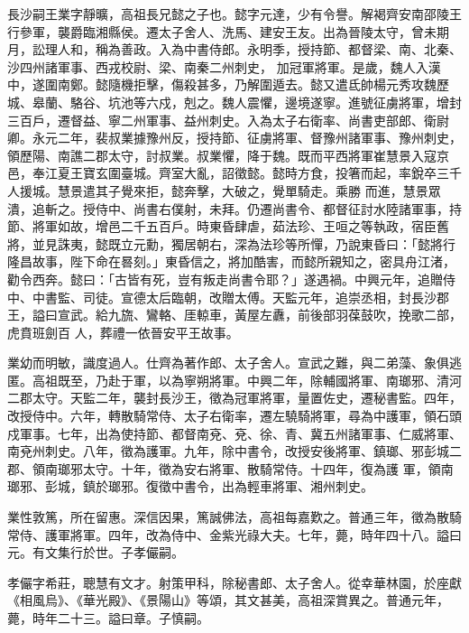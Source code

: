 
\begin{pinyinscope}

 長沙嗣王業字靜曠，高祖長兄懿之子也。懿字元達，少有令譽。解褐齊安南邵陵王行參軍，襲爵臨湘縣侯。遷太子舍人、洗馬、建安王友。出為晉陵太守，曾未期月，訟理人和，稱為善政。入為中書侍郎。永明季，授持節、都督梁、南、北秦、沙四州諸軍事、西戎校尉、梁、南秦二州刺史，
 加冠軍將軍。是歲，魏人入漢中，遂圍南鄭。懿隨機拒擊，傷殺甚多，乃解圍遁去。懿又遣氐帥楊元秀攻魏歷城、皋蘭、駱谷、坑池等六戍，剋之。魏人震懼，邊境遂寧。進號征虜將軍，增封三百戶，遷督益、寧二州軍事、益州刺史。入為太子右衛率、尚書吏部郎、衛尉卿。永元二年，裴叔業據豫州反，授持節、征虜將軍、督豫州諸軍事、豫州刺史，領歷陽、南譙二郡太守，討叔業。叔業懼，降于魏。既而平西將軍崔慧景入寇京邑，奉江夏王寶玄圍臺城。齊室大亂，詔徵懿。懿時方食，投箸而起，率銳卒三千人援城。慧景遣其子覺來拒，懿奔擊，大破之，覺單騎走。乘勝
 而進，慧景眾潰，追斬之。授侍中、尚書右僕射，未拜。仍遷尚書令、都督征討水陸諸軍事，持節、將軍如故，增邑二千五百戶。時東昏肆虐，茹法珍、王咺之等執政，宿臣舊將，並見誅夷，懿既立元勳，獨居朝右，深為法珍等所憚，乃說東昏曰：「懿將行隆昌故事，陛下命在晷刻。」東昏信之，將加酷害，而懿所親知之，密具舟江渚，勸令西奔。懿曰：「古皆有死，豈有叛走尚書令耶？」遂遇禍。中興元年，追贈侍中、中書監、司徒。宣德太后臨朝，改贈太傅。天監元年，追崇丞相，封長沙郡王，謚曰宣武。給九旒、鸞輅、厓輬車，黃屋左纛，前後部羽葆鼓吹，挽歌二部，虎賁班劍百
 人，葬禮一依晉安平王故事。



 業幼而明敏，識度過人。仕齊為著作郎、太子舍人。宣武之難，與二弟藻、象俱逃匿。高祖既至，乃赴于軍，以為寧朔將軍。中興二年，除輔國將軍、南瑯邪、清河二郡太守。天監二年，襲封長沙王，徵為冠軍將軍，量置佐史，遷秘書監。四年，改授侍中。六年，轉散騎常侍、太子右衛率，遷左驍騎將軍，尋為中護軍，領石頭戍軍事。七年，出為使持節、都督南兗、兗、徐、青、冀五州諸軍事、仁威將軍、南兗州刺史。八年，徵為護軍。九年，除中書令，改授安後將軍、鎮瑯、邪彭城二郡、領南瑯邪太守。十年，徵為安右將軍、散騎常侍。十四年，復為護
 軍，領南瑯邪、彭城，鎮於瑯邪。復徵中書令，出為輕車將軍、湘州刺史。



 業性敦篤，所在留惠。深信因果，篤誠佛法，高祖每嘉歎之。普通三年，徵為散騎常侍、護軍將軍。四年，改為侍中、金紫光祿大夫。七年，薨，時年四十八。謚曰元。有文集行於世。子孝儼嗣。



 孝儼字希莊，聰慧有文才。射策甲科，除秘書郎、太子舍人。從幸華林園，於座獻《相風烏》、《華光殿》、《景陽山》等頌，其文甚美，高祖深賞異之。普通元年，薨，時年二十三。謚曰章。子慎嗣。




\end{pinyinscope}
